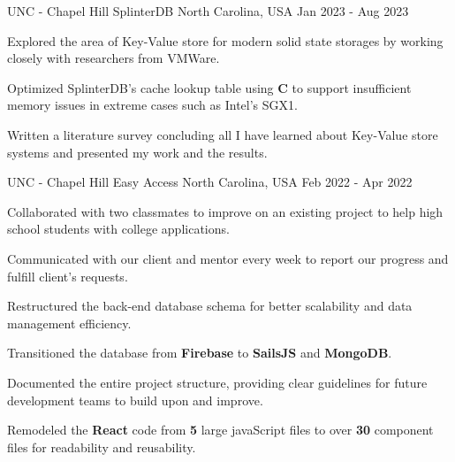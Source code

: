 

\begin{cventries}

  \cventry
    {UNC - Chapel Hill} %
    {SplinterDB} %
    {North Carolina, USA} %
    {Jan 2023 - Aug 2023} %
    {
      \begin{cvitems} %
        \item {Explored the area of Key-Value store for modern solid state storages by working closely with researchers from VMWare.}
        \item {Optimized SplinterDB's cache lookup table using \textbf{C} to support insufficient memory issues in extreme cases such as Intel's SGX1.}
        \item {Written a literature survey concluding all I have learned about Key-Value store systems and presented my work and the results.}
      \end{cvitems}
    }

  \cventry
  {UNC - Chapel Hill} %
  {Easy Access} %
  {North Carolina, USA} %
  {Feb 2022 - Apr 2022} %
  {
    \begin{cvitems} %
      \item {Collaborated with two classmates to improve on an existing project to help high school students with college applications.}
      \item {Communicated with our client and mentor every week to report our progress and fulfill client's requests.}
      \item {Restructured the back-end database schema for better scalability and data management efficiency.}
      \item {Transitioned the database from \textbf{Firebase} to \textbf{SailsJS} and \textbf{MongoDB}.}
      \item {Documented the entire project structure, providing clear guidelines for future development teams to build upon and improve.}
      \item {Remodeled the \textbf{React} code from \textbf{5} large javaScript files to over \textbf{30} component files for readability and reusability.}
    \end{cvitems}
  }


\end{cventries}
